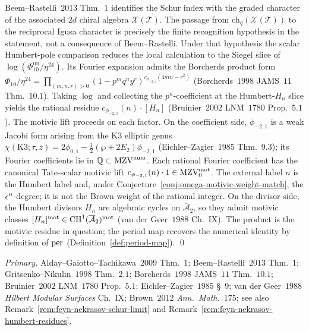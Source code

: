 \begin{proposition}
Beem--Rastelli~$2013$ Thm.~$1$ identifies the Schur index with the
graded character of the associated $2d$ chiral algebra
$\mathcal X(\mathcal T)$. The passage from
$\mathrm{ch}_q(\mathcal X(\mathcal T))$ to the reciprocal Igusa
character is precisely the finite recognition hypothesis in the
statement, not a consequence of Beem--Rastelli. Under that hypothesis
the scalar Humbert-pole comparison reduces the local calculation to the
Siegel slice of $\log(\Phi_{10}^{\mathrm{un}}/\eta^{24})$. Its Fourier
expansion admits the Borcherds product form
$\Phi_{10}/\eta^{24} = \prod_{(m,n,r) > 0}(1 - p^m q^n y^r)^{
c_{\phi_{-2,1}}(4mn - r^2)}$ (Borcherds~$1998$ JAMS~$11$
Thm.~$10.1$). Taking $\log$ and collecting the $p^n$-coefficient
at the Humbert-$H_n$ slice yields the rational residue
$c_{\phi_{-2,1}}(n)\cdot [H_n]$ (Bruinier~$2002$ LNM~$1780$
Prop.~$5.1$). The motivic lift proceeds on each factor. On the
coefficient side, $\phi_{-2,1}$ is a weak Jacobi form arising
from the K3 elliptic genus $\chi(\mathrm K3; \tau, z) = 2\phi_{0,1}
- \tfrac{1}{2}(\wp + 2 E_2)\phi_{-2,1}$ (Eichler--Zagier~$1985$
Thm.~$9.3$); its Fourier coefficients lie in
$\mathbb Q\subset \mathrm{MZV}^{\mathrm{num}}$. Each rational Fourier coefficient has
the canonical Tate-scalar motivic lift
$c_{\phi_{-2,1}}(n)\cdot1\in\mathrm{MZV}^{\mathrm{mot}}_0$. The external label $n$ is
the Humbert label and, under
Conjecture~\ref{conj:omega-motivic-weight-match}, the $\epsilon^n$-degree;
it is not the Brown weight of the rational integer. On the divisor
side, the Humbert divisors $H_n$ are algebraic cycles on
$\overline{\mathcal A}_2$, so they admit motivic classes
$[H_n]^{\mathrm{mot}}\in \mathrm{CH}^1(\overline{\mathcal A}_2)^{\mathrm{mot}}$
(van der Geer~$1988$ Ch.~IX). The product is the motivic
residue in question; the period map recovers the numerical
identity by definition of $\mathrm{per}$ (Definition~\ref{def:period-map}).
\qed

\emph{Primary.} Alday--Gaiotto--Tachikawa~$2009$ Thm.~$1$;
Beem--Rastelli~$2013$ Thm.~$1$; Gritsenko--Nikulin~$1998$
Thm.~$2.1$; Borcherds~$1998$ JAMS~$11$ Thm.~$10.1$;
Bruinier~$2002$ LNM~$1780$ Prop.~$5.1$; Eichler--Zagier~$1985$
\S~$9$; van der Geer~$1988$ \emph{Hilbert Modular Surfaces}
Ch.~IX; Brown~$2012$ \emph{Ann.\ Math.}~$175$; see also
Remark~\ref{rem:feyn-nekrasov-schur-limit} and
Remark~\ref{rem:feyn-nekrasov-humbert-residues}.
\end{proposition}

